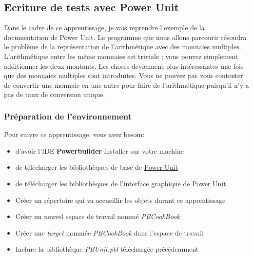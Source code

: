 \documentclass[a4paper,11pt,french]{refart}
\theoremstyle{definition}
\begin{document}
\subsection{Ecriture de tests avec Power Unit}
Dans le cadre de ce apprentissage, je vais reprendre l'exemple de la documentation de Power Unit.
Le programme que nous allons parcourir résoudra le problème de la représentation de l'arithmétique avec des monnaies multiples. 
 L'arithmétique entre les même monnaies  est triviale ; vous pouvez simplement additionner les deux montants.
 Les choses deviennent plus intéressantes une fois que des monnaies multiples sont introduites. 
 Vous ne pouvez pas vous contenter de convertir une monnaie en une autre pour faire de l'arithmétique puisqu'il n'y a pas de taux de conversion unique.

\subsubsection{Préparation de l'environnement}
Pour suivre ce apprentissage, vous avez besoin:
\begin{itemize}
    \item d'avoir l'IDE \textbf{Powerbuilder} installer sur votre machine
    \item de télécharger les bibliothèques de base de \href{https://github.com/mahugnon/PBUnitBase.git}{ Power Unit}
    \item de télécharger les bibliothèques de l'interface graphique de \href{https://github.com/mahugnon/PBUnitGUI.git}{Power Unit} 
    \item Créer un répertoire qui va accueillir les objets durant ce apprentissage  
    \item Créer un nouvel espace de travail nommé \textit{PBCookBook} 
    \item Créer une \textit{target} nommée \textit{PBCookBook} dans l'espace de travail.
    \item Inclure la bibliothèque \textit{PBUnit.pbl} téléchargée précédemment 
\end{itemize}

\end{document}
